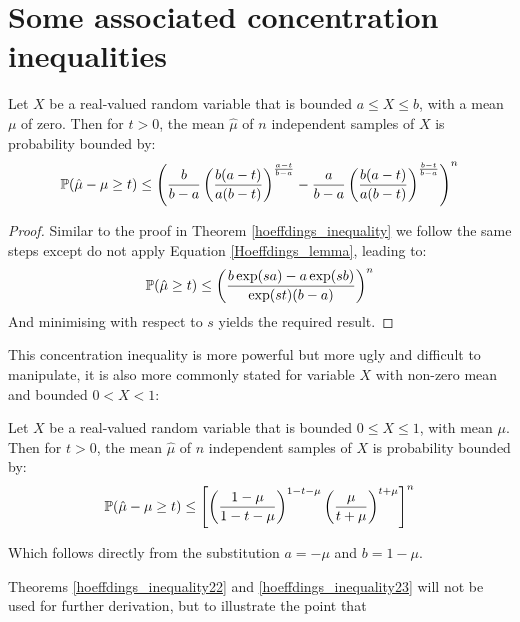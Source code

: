 
\section{Some associated concentration inequalities}\label{Appendix:more_concentration}

\begin{theorem}\label{hoeffdings_inequality22}
Let $X$ be a real-valued random variable that is bounded $a\le X\le b$, with a mean $\mu$ of zero.  Then for $t>0$, the mean $\hat{\mu}$ of $n$ independent samples of $X$ is probability bounded by:
\begin{equation}\operatorname{\mathbb{P}}(\hat{\mu}-\mu\ge t)\le \left( \frac{b}{b-a}\left(\frac{b(a-t)}{a(b-t)}\right)^{\frac{a-t}{b-a}} -\frac{a}{b-a}\left(\frac{b(a-t)}{a(b-t)}\right)^{\frac{b-t}{b-a}}  \right)^n
\end{equation}
\end{theorem}
\begin{proof}
Similar to the proof in Theorem \ref{hoeffdings_inequality} we follow the same steps except do not apply Equation \ref{Hoeffdings_lemma}, leading to:
$$ \operatorname{\mathbb{P}}(\hat{\mu}\ge t) \le \left(\frac{b\exp(sa) - a\exp(sb)}{\exp(st)(b-a)}\right)^n $$
And minimising with respect to $s$ 
yields the required result.
\end{proof}
This concentration inequality is more powerful but more ugly and difficult to manipulate, it is also more commonly stated for variable $X$ with non-zero mean and bounded $0<X<1$:

\begin{theorem}\label{hoeffdings_inequality23}
Let $X$ be a real-valued random variable that is bounded $0\le X\le 1$, with mean $\mu$. Then for $t>0$, the mean $\hat{\mu}$ of $n$ independent samples of $X$ is probability bounded by:
\begin{equation}\operatorname{\mathbb{P}}(\hat{\mu}-\mu\ge t)\le \left[\left(\frac{1-\mu}{1-t-\mu}\right)^{1-t-\mu}  \left(\frac{\mu}{t+\mu}\right)^{t+\mu}\right]^n
\end{equation}
\end{theorem}
Which follows directly from the substitution $a=-\mu$ and $b=1-\mu$.

Theorems \ref{hoeffdings_inequality22} and \ref{hoeffdings_inequality23} will not be used for further derivation, but to illustrate the point that 




